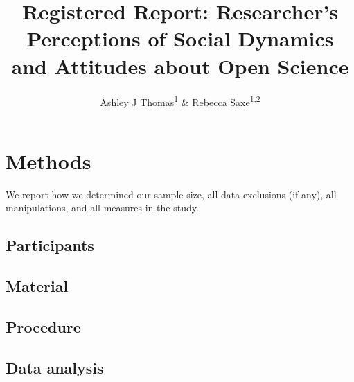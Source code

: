 \documentclass[
  english,
  man]{apa6}
\title{Registered Report: Researcher's Perceptions of Social Dynamics and Attitudes about Open Science}
\author{Ashley J Thomas\textsuperscript{1} \& Rebecca Saxe\textsuperscript{1,2}}
\date{}
\affiliation{\vspace{0.5cm}\textsuperscript{1} MIT\\\textsuperscript{2} CREOS}
\begin{document}
\maketitle

\hypertarget{methods}{%
\section{Methods}\label{methods}}

We report how we determined our sample size, all data exclusions (if any), all manipulations, and all measures in the study.

\hypertarget{participants}{%
\subsection{Participants}\label{participants}}

\hypertarget{material}{%
\subsection{Material}\label{material}}

\hypertarget{procedure}{%
\subsection{Procedure}\label{procedure}}

\hypertarget{data-analysis}{%
\subsection{Data analysis}\label{data-analysis}}
\end{document}
